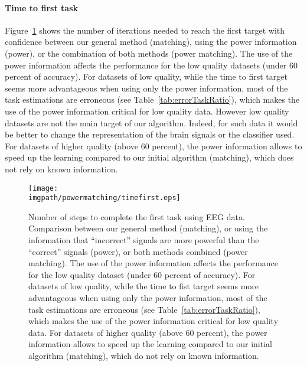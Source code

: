 \paragraph{Time to first task} Figure~\ref{fig:timefirst_powermatching} shows the number of iterations needed to reach the first target with confidence between our general method (matching), using the power information (power), or the combination of both methods (power matching). The use of the power information affects the performance for the low quality datasets (under 60 percent of accuracy). For datasets of low quality, while the time to first target seems more advantageous when using only the power information, most of the task estimations are erroneous (see Table~\ref{tab:errorTaskRatio}), which makes the use of the power information critical for low quality data. However low quality datasets are not the main target of our algorithm. Indeed, for such data it would be better to change the representation of the brain signals or the classifier used. For datasets of higher quality (above 60 percent), the power information allows to speed up the learning compared to our initial algorithm (matching), which does not rely on known information.

\begin{figure}[!htbp]
\centering
\texttt{[image: \\imgpath/powermatching/timefirst.eps]}
\caption{Number of steps to complete the first task using EEG data. Comparison between our general method (matching), or using the information that ``incorrect'' signals are more powerful than the ``correct'' signals (power), or both methods combined (power matching). The use of the power information affects the performance for the low quality dataset (under 60 percent of accuracy). For datasets of low quality, while the time to fist target seems more advantageous when using only the power information, most of the task estimations are erroneous (see Table~\ref{tab:errorTaskRatio}), which makes the use of the power information critical for low quality data. For datasets of higher quality (above 60 percent), the power information allows to speed up the learning compared to our initial algorithm (matching), which do not rely on known information.}
\label{fig:timefirst_powermatching}
\end{figure} 

